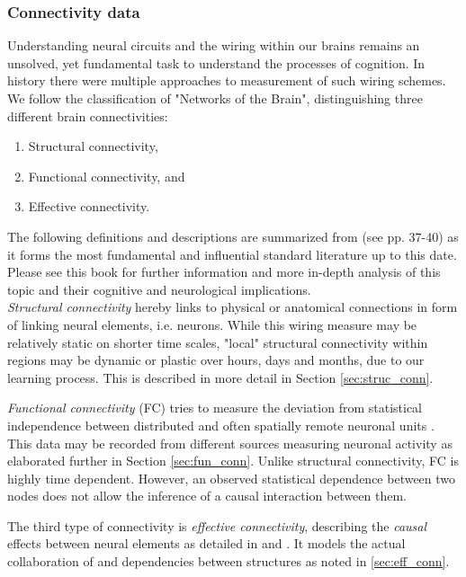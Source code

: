 \documentclass[]{article}
\renewcommand{\cite}{\citep}
\begin{document}
\subsubsection{Connectivity data}
Understanding neural circuits and the wiring within our brains remains an unsolved, yet fundamental task to understand the processes of cognition. In history there were multiple approaches to measurement of such wiring schemes. We follow the classification of "Networks of the Brain"\cite{sporns2016networks}, distinguishing three different brain connectivities:
\begin{enumerate}
	\item Structural connectivity,
	\item Functional connectivity, and 
	\item Effective connectivity.
\end{enumerate}

The following definitions and descriptions are summarized from \citet{sporns2016networks}(see pp. 37-40) as it forms the most fundamental and influential standard literature up to this date. Please see this book for further information and more in-depth analysis of this topic and their cognitive and neurological implications.\\

\textit{Structural connectivity} hereby links to physical or anatomical connections in form of linking neural elements, i.e. neurons. While this wiring measure may be relatively static on shorter time scales, "local" structural connectivity within regions may be dynamic or plastic over hours, days and months, due to our learning process. This is described in more detail in Section \ref{sec:struc_conn}.

\textit{Functional connectivity} (FC) tries to measure the deviation from statistical independence between distributed and often spatially remote neuronal units \cite{friston1993functional, friston1994statistical}. This data may be recorded from different sources measuring neuronal activity as elaborated further in Section \ref{sec:fun_conn}. Unlike structural connectivity, FC is highly time dependent. However, an observed statistical dependence between two nodes does not allow the inference of a causal interaction between them.

The third type of connectivity is \textit{effective connectivity}, describing the \textit{causal} effects between neural elements as detailed in \citet{friston1994functional} and \citet{friston2000attentional}. It models the actual collaboration of and dependencies between structures as noted in \ref{sec:eff_conn}.\\
\end{document}
